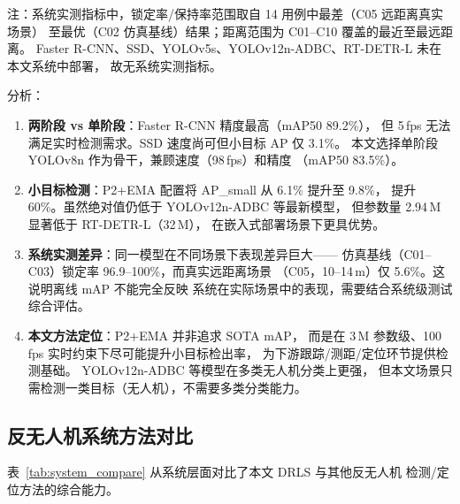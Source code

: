 \documentclass[12pt, a4paper]{ctexart}
\begin{document}
注：系统实测指标中，锁定率/保持率范围取自 14 用例中最差（C05 远距离真实场景）
至最优（C02 仿真基线）结果；距离范围为 C01--C10 覆盖的最近至最远距离。
Faster R-CNN、SSD、YOLOv5s、YOLOv12n-ADBC、RT-DETR-L 未在本文系统中部署，
故无系统实测指标。

分析：

\begin{enumerate}
  \item \textbf{两阶段 vs 单阶段}：Faster R-CNN 精度最高（mAP50 89.2\%），
        但 5\,fps 无法满足实时检测需求。SSD 速度尚可但小目标 AP 仅 3.1\%。
        本文选择单阶段 YOLOv8n 作为骨干，兼顾速度（98\,fps）和精度
        （mAP50 83.5\%）。

  \item \textbf{小目标检测}：P2+EMA 配置将 AP\_small 从 6.1\% 提升至 9.8\%，
        提升 60\%。虽然绝对值仍低于 YOLOv12n-ADBC 等最新模型，
        但参数量 2.94\,M 显著低于 RT-DETR-L（32\,M），
        在嵌入式部署场景下更具优势。

  \item \textbf{系统实测差异}：同一模型在不同场景下表现差异巨大——
        仿真基线（C01--C03）锁定率 96.9--100\%，而真实远距离场景
        （C05，10--14\,m）仅 5.6\%。这说明离线 mAP 不能完全反映
        系统在实际场景中的表现，需要结合系统级测试综合评估。

  \item \textbf{本文方法定位}：P2+EMA 并非追求 SOTA mAP，
        而是在 3\,M 参数级、100\,fps 实时约束下尽可能提升小目标检出率，
        为下游跟踪/测距/定位环节提供检测基础。
        YOLOv12n-ADBC 等模型在多类无人机分类上更强，
        但本文场景只需检测一类目标（无人机），不需要多类分类能力。
\end{enumerate}

\subsection{反无人机系统方法对比}

表~\ref{tab:system_compare} 从系统层面对比了本文 DRLS 与其他反无人机
检测/定位方法的综合能力。
\end{document}
